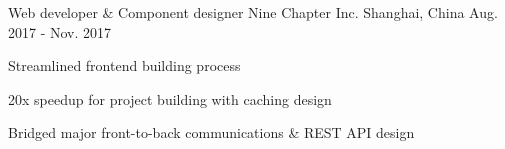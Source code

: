\begin{cventries}
  \cventry
    {Web developer \& Component designer}
    {Nine Chapter Inc.}
    {Shanghai, China}
    {Aug. 2017 - Nov. 2017}
    {
      \begin{cvitems}
        \item {Streamlined frontend building process}
        \item {20x speedup for project building with caching design}
        \item {Bridged major front-to-back communications \& REST API design}
      \end{cvitems}
    }


\end{cventries}
